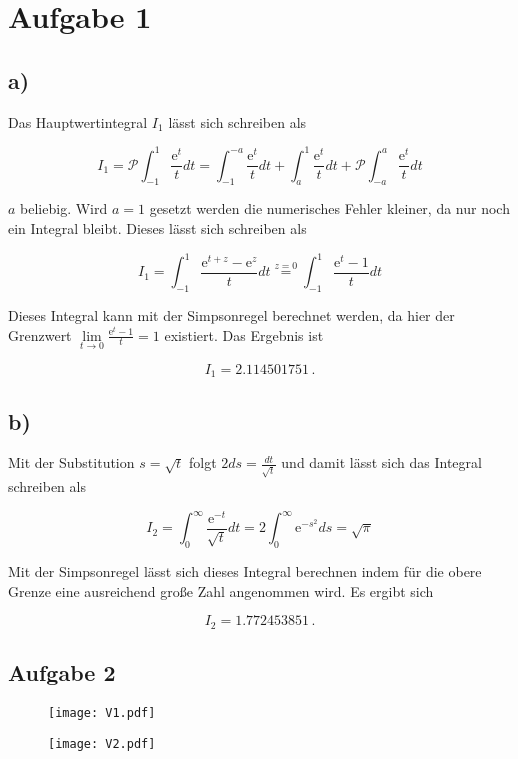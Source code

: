 \documentclass[paper=a4, ngerman]{scrartcl}
\renewcommand{\exp}[1]{\ensuremath{\text{e}^{#1}}}
\begin{document}
\section{Aufgabe 1}
\subsection{a)}

Das Hauptwertintegral $I_1$ lässt sich schreiben als

\begin{equation}
I_1 = \mathcal{P}\int_{-1}^{1} \frac{\exp{t}}{t} dt = \int_{-1}^{-a} \frac{\exp{t}}{t} dt + \int_{a}^{1} \frac{\exp{t}}{t} dt + \mathcal{P}\int_{-a}^{a} \frac{\exp{t}}{t} dt
\end{equation}

$a$ beliebig. Wird $a=1$ gesetzt werden die numerisches Fehler kleiner, da nur noch ein Integral bleibt. Dieses lässt sich schreiben als

\begin{equation}
I_1 = \int_{-1}^{1} \frac{\exp{t+z} - \exp{z}}{t} dt \overset{z=0}{=} \int_{-1}^{1} \frac{\exp{t} - 1}{t} dt 
\end{equation}

Dieses Integral kann mit der Simpsonregel berechnet werden, da hier der Grenzwert $\underset{t \rightarrow 0}{\lim} \frac{\exp{t} - 1}{t} = 1$ existiert. Das Ergebnis ist

\begin{equation}
I_1 = 2.114501751 \,.
\end{equation}

\subsection{b)}

Mit der Substitution $s = \sqrt{t}$ folgt $2 ds = \frac{dt}{\sqrt{t}}$ und damit lässt sich das Integral schreiben als

\begin{equation}
I_2 = \int_{0}^{\infty} \frac{\exp{-t}}{\sqrt{t}} dt = 2 \int_{0}^{\infty} \exp{-s^2} ds = \sqrt{\pi}
\end{equation}

Mit der Simpsonregel lässt sich dieses Integral berechnen indem für die obere Grenze eine ausreichend große Zahl angenommen wird. Es ergibt sich

\begin{equation}
I_2 = 1.772453851 \,.
\end{equation}

\FloatBarrier
\subsection{Aufgabe 2}

\begin{figure}
	\centering
	\texttt{[image: V1.pdf]}
\end{figure}

\begin{figure}
	\centering
	\texttt{[image: V2.pdf]}
\end{figure}
\end{document}
